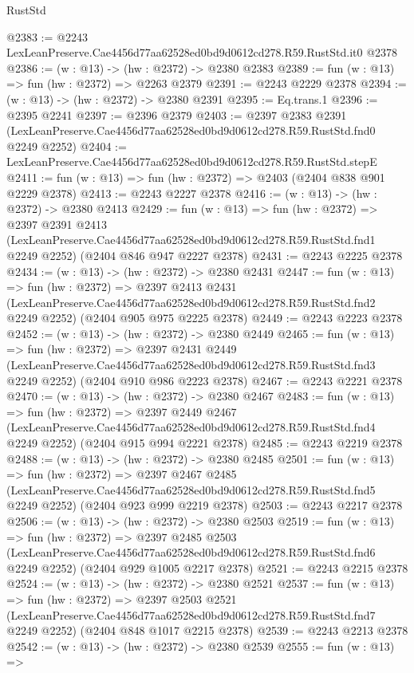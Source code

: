 \begin{lexlean}{RustStd}
\begin{coremodule}
@2383 := @2243 LexLeanPreserve.Cae4456d77aa62528ed0bd9d0612cd278.R59.RustStd.it0 @2378
@2386 := (w : @13) -> (hw : @2372) -> @2380 @2383
@2389 := fun (w : @13) => fun (hw : @2372) => @2263 @2379
@2391 := @2243 @2229 @2378
@2394 := (w : @13) -> (hw : @2372) -> @2380 @2391
@2395 := Eq.trans.{1}
@2396 := @2395 @2241
@2397 := @2396 @2379
@2403 := @2397
    @2383
    @2391
    (LexLeanPreserve.Cae4456d77aa62528ed0bd9d0612cd278.R59.RustStd.fnd0 @2249 @2252)
@2404 := LexLeanPreserve.Cae4456d77aa62528ed0bd9d0612cd278.R59.RustStd.stepE
@2411 := fun (w : @13) => fun (hw : @2372) => @2403 (@2404 @838 @901 @2229 @2378)
@2413 := @2243 @2227 @2378
@2416 := (w : @13) -> (hw : @2372) -> @2380 @2413
@2429 := fun (w : @13) =>
  fun (hw : @2372) =>
  @2397
    @2391
    @2413
    (LexLeanPreserve.Cae4456d77aa62528ed0bd9d0612cd278.R59.RustStd.fnd1 @2249 @2252)
    (@2404 @846 @947 @2227 @2378)
@2431 := @2243 @2225 @2378
@2434 := (w : @13) -> (hw : @2372) -> @2380 @2431
@2447 := fun (w : @13) =>
  fun (hw : @2372) =>
  @2397
    @2413
    @2431
    (LexLeanPreserve.Cae4456d77aa62528ed0bd9d0612cd278.R59.RustStd.fnd2 @2249 @2252)
    (@2404 @905 @975 @2225 @2378)
@2449 := @2243 @2223 @2378
@2452 := (w : @13) -> (hw : @2372) -> @2380 @2449
@2465 := fun (w : @13) =>
  fun (hw : @2372) =>
  @2397
    @2431
    @2449
    (LexLeanPreserve.Cae4456d77aa62528ed0bd9d0612cd278.R59.RustStd.fnd3 @2249 @2252)
    (@2404 @910 @986 @2223 @2378)
@2467 := @2243 @2221 @2378
@2470 := (w : @13) -> (hw : @2372) -> @2380 @2467
@2483 := fun (w : @13) =>
  fun (hw : @2372) =>
  @2397
    @2449
    @2467
    (LexLeanPreserve.Cae4456d77aa62528ed0bd9d0612cd278.R59.RustStd.fnd4 @2249 @2252)
    (@2404 @915 @994 @2221 @2378)
@2485 := @2243 @2219 @2378
@2488 := (w : @13) -> (hw : @2372) -> @2380 @2485
@2501 := fun (w : @13) =>
  fun (hw : @2372) =>
  @2397
    @2467
    @2485
    (LexLeanPreserve.Cae4456d77aa62528ed0bd9d0612cd278.R59.RustStd.fnd5 @2249 @2252)
    (@2404 @923 @999 @2219 @2378)
@2503 := @2243 @2217 @2378
@2506 := (w : @13) -> (hw : @2372) -> @2380 @2503
@2519 := fun (w : @13) =>
  fun (hw : @2372) =>
  @2397
    @2485
    @2503
    (LexLeanPreserve.Cae4456d77aa62528ed0bd9d0612cd278.R59.RustStd.fnd6 @2249 @2252)
    (@2404 @929 @1005 @2217 @2378)
@2521 := @2243 @2215 @2378
@2524 := (w : @13) -> (hw : @2372) -> @2380 @2521
@2537 := fun (w : @13) =>
  fun (hw : @2372) =>
  @2397
    @2503
    @2521
    (LexLeanPreserve.Cae4456d77aa62528ed0bd9d0612cd278.R59.RustStd.fnd7 @2249 @2252)
    (@2404 @848 @1017 @2215 @2378)
@2539 := @2243 @2213 @2378
@2542 := (w : @13) -> (hw : @2372) -> @2380 @2539
@2555 := fun (w : @13) =>

\end{coremodule}
\end{lexlean}
